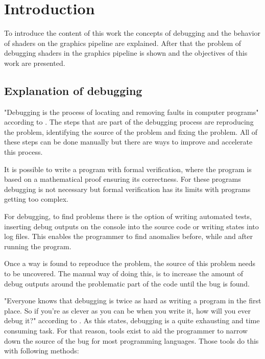 
\chapter{Introduction}\label{cha:Introduction}

To introduce the content of this work the concepts of debugging and the behavior of shaders on the graphics pipeline are explained. After that the problem of debugging shaders in the graphics pipeline is shown and the objectives of this work are presented.

\section{Explanation of debugging}
\label{paragraph:debuging}

"Debugging is the process of locating and removing faults in computer programs" according to . The steps that are part of the debugging process are reproducing the problem, identifying the source of the problem and fixing the problem. All of these steps can be done manually but there are ways to improve and accelerate this process.

It is possible to write a program with formal verification, where the program is based on a mathematical proof ensuring its correctness. For these programs debugging is not necessary but formal verification has its limits with programs getting too complex. 

For debugging, to find problems there is the option of writing automated tests, inserting debug outputs on the console into the source code or writing states into log files. This enables the programmer to find anomalies before, while and after running the program.

Once a way is found to reproduce the problem, the source of this problem needs to be uncovered. The manual way of doing this, is to increase the amount of debug outputs around the problematic part of the code until the bug is found.

"Everyone knows that debugging is twice as hard as writing a program in the first place. So if you're as clever as you can be when you write it, how will you ever debug it?" according to . As this states, debugging is a quite exhausting and time consuming task. For that reason, tools exist to aid the programmer to narrow down the source of the bug for most programming languages. Those tools do this with following methods:

